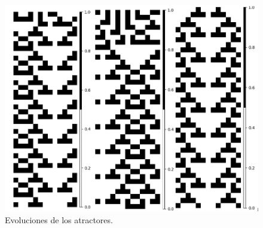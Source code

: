 \documentclass[11pt]{article}
\begin{document}
\begin{figure}[H]
			\includegraphics[scale=0.3]{resources/Atractores22/atractor_22_size_13_res2.png}
			\caption{Evoluciones de los atractores.}\label{fig:picture}
			\end{figure}
\end{document}
